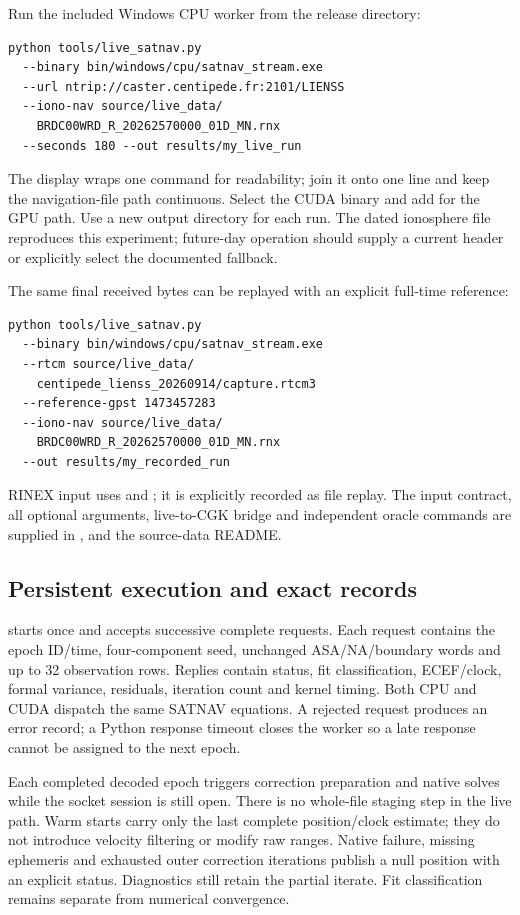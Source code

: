 Run the included Windows CPU worker from the release directory:
\begin{lstlisting}
python tools/live_satnav.py
  --binary bin/windows/cpu/satnav_stream.exe
  --url ntrip://caster.centipede.fr:2101/LIENSS
  --iono-nav source/live_data/
    BRDC00WRD_R_20262570000_01D_MN.rnx
  --seconds 180 --out results/my_live_run
\end{lstlisting}
The display wraps one command for readability; join it onto one line and keep
the navigation-file path continuous. Select the CUDA binary and add
 for the GPU path. Use a new output directory for each run.
The dated ionosphere file reproduces this experiment; future-day operation
should supply a current header or explicitly select the documented fallback.

The same final received bytes can be replayed with an explicit full-time reference:
\begin{lstlisting}
python tools/live_satnav.py
  --binary bin/windows/cpu/satnav_stream.exe
  --rtcm source/live_data/
    centipede_lienss_20260914/capture.rtcm3
  --reference-gpst 1473457283
  --iono-nav source/live_data/
    BRDC00WRD_R_20262570000_01D_MN.rnx
  --out results/my_recorded_run
\end{lstlisting}
RINEX input uses  and ; it is explicitly recorded
as file replay. The input contract, all optional arguments, live-to-CGK bridge
and independent oracle commands are supplied in ,
 and the source-data README.



\subsection{Persistent execution and exact records}
 starts once and accepts successive complete requests. Each
request contains the epoch ID/time, four-component seed, unchanged ASA/NA/boundary
words and up to 32 observation rows. Replies contain status, fit classification,
ECEF/clock, formal variance, residuals, iteration count and kernel timing. Both
CPU and CUDA dispatch the same SATNAV equations. A rejected request produces an
error record; a Python response timeout closes the worker so a late response
cannot be assigned to the next epoch.

Each completed decoded epoch triggers correction preparation and native solves
while the socket session is still open. There is no whole-file staging step in
the live path. Warm starts carry only the last complete position/clock estimate;
they do not introduce velocity filtering or modify raw ranges. Native failure,
missing ephemeris and exhausted outer correction iterations publish a null
position with an explicit status. Diagnostics still retain the partial iterate.
Fit classification remains separate from numerical convergence.

